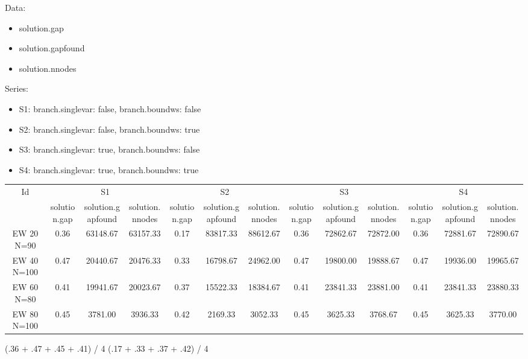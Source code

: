 \documentclass[landscape, 12pt]{report}
\begin{document}
Data:
\begin{itemize}
\item solution.gap
\item solution.gapfound
\item solution.nnodes
\end{itemize}
Series:
\begin{itemize}
\item S1: branch.singlevar: false, branch.boundws: false
\item S2: branch.singlevar: false, branch.boundws: true
\item S3: branch.singlevar: true, branch.boundws: false
\item S4: branch.singlevar: true, branch.boundws: true
\end{itemize}
\begin{tabular}{|c|ccc|ccc|ccc|ccc|}
\hline
\multicolumn{1}{|c|}{Id} & \multicolumn{3}{|c|}{S1} & \multicolumn{3}{|c|}{S2} & \multicolumn{3}{|c|}{S3} & \multicolumn{3}{|c|}{S4}
\\
 & solution.gap & solution.gapfound & solution.nnodes & solution.gap & solution.gapfound & solution.nnodes & solution.gap & solution.gapfound & solution.nnodes & solution.gap & solution.gapfound & solution.nnodes
\\
\hline
EW 20 N=90 & 0.36 & 63148.67 & 63157.33 & 0.17 & 83817.33 & 88612.67 & 0.36 & 72862.67 & 72872.00 & 0.36 & 72881.67 & 72890.67
\\
EW 40 N=100 & 0.47 & 20440.67 & 20476.33 & 0.33 & 16798.67 & 24962.00 & 0.47 & 19800.00 & 19888.67 & 0.47 & 19936.00 & 19965.67
\\
EW 60 N=80 & 0.41 & 19941.67 & 20023.67 & 0.37 & 15522.33 & 18384.67 & 0.41 & 23841.33 & 23881.00 & 0.41 & 23841.33 & 23880.33
\\
EW 80 N=100 & 0.45 & 3781.00 & 3936.33 & 0.42 & 2169.33 & 3052.33 & 0.45 & 3625.33 & 3768.67 & 0.45 & 3625.33 & 3770.00
\\
\hline 
 \end{tabular}

(.36 + .47 + .45 + .41) / 4
(.17 + .33 + .37 + .42) / 4

\clearpage
\end{document}
